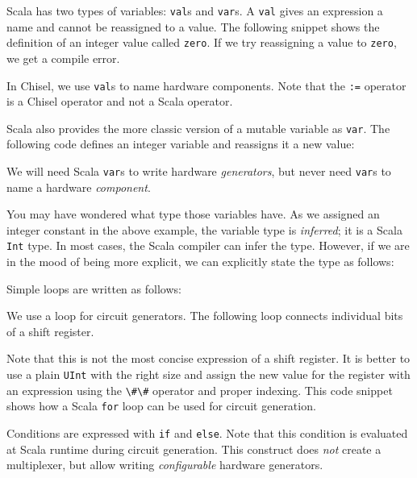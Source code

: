 \documentclass[%
    10pt,
    headinclude, footexclude,
    openright, %
    notitlepage,
    cleardoubleempty,
    headsepline,
    pointlessnumbers,
    bibtotoc, idxtotoc,
    ]{scrbook}
\newcommand{\code}[1]{{\lstinline[basicstyle=\small\ttfamily]{#1}}}
\begin{document}
Scala has two types of variables: \code{val}s and \code{var}s. A \code{val} gives an expression
a name and cannot be reassigned to a value. The following snippet shows the definition of
an integer value called \code{zero}. If we try reassigning a value to \code{zero}, we get
a compile error.


\noindent In Chisel, we use \code{val}s to name hardware components. Note that the \code{:=}
operator is a Chisel operator and not a Scala operator.

Scala also provides the more classic version of a mutable variable as \code{var}. The following code defines
an integer variable and reassigns it a new value:


\noindent We will need Scala \code{var}s to write hardware \emph{generators}, but never need
\code{var}s to name a hardware \emph{component}.

You may have wondered what type those variables have. As we assigned an integer constant
in the above example, the variable type is \emph{inferred}; it is a Scala \code{Int} type.
In most cases, the Scala compiler can infer the type. However, if we are in the mood of
being more explicit, we can explicitly state the type as follows:


Simple loops are written as follows:


We use a loop for circuit generators. The following loop connects individual bits
of a shift register.


\noindent Note that this is not the most concise expression of a shift register.
It is better to use a plain \code{UInt} with the right size and assign the new value for the
register with an expression using the \code{\#\#} operator
and proper indexing. This code snippet shows how a Scala \code{for} loop can be used
for circuit generation.

Conditions are expressed with \code{if} and \code{else}. Note that this condition
is evaluated at Scala runtime during circuit generation. This construct does \emph{not}
create a multiplexer, but allow writing \emph{configurable} hardware generators.

\end{document}

